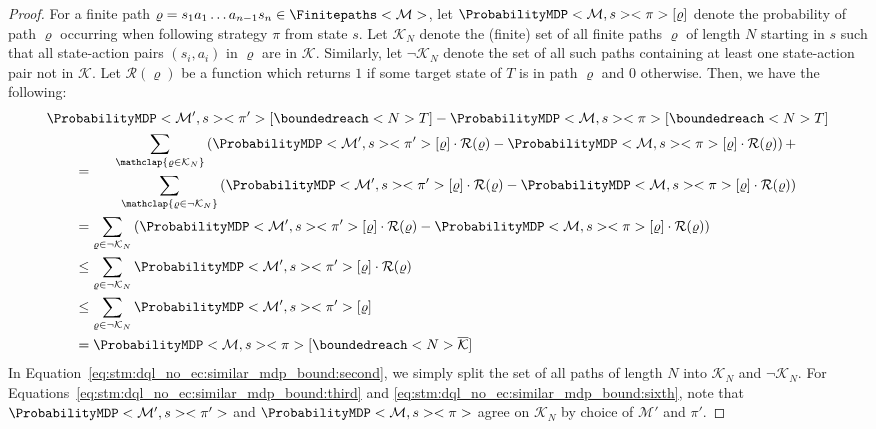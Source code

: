 \documentclass{theoretics}
\newcommand{\MDP}{\mathcal{M}}
\newcommand{\finitepath}{\varrho}
\newcommand{\strategy}{\pi}
\newcommand{\targetset}{T}
\begin{document}
\begin{proof}
	For a finite path $\finitepath = s_1 a_1 \ldots a_{n-1} s_n \in \Finitepaths<\MDP>$, let $\ProbabilityMDP<\MDP, s><\strategy>[\finitepath]$ denote the probability of path $\finitepath$ occurring when following strategy $\strategy$ from state $s$.
	Let $\mathcal{K}_N$ denote the (finite) set of all finite paths $\finitepath$ of length $N$ starting in $s$ such that all state-action pairs $(s_i, a_i)$ in $\finitepath$ are in $\mathcal{K}$.
	Similarly, let $\lnot \mathcal{K}_N$ denote the set of all such paths containing at least one state-action pair not in $\mathcal{K}$.
	Let $\mathcal{R}(\finitepath)$ be a function which returns $1$ if some target state of $\targetset$ is in path $\finitepath$ and $0$ otherwise.
	Then, we have the following:
	\begin{align}
		& \ProbabilityMDP<\MDP', s><\strategy'>[\boundedreach<N> \targetset] - \ProbabilityMDP<\MDP, s><\strategy>[\boundedreach<N> \targetset] \label{eq:stm:dql_no_ec:similar_mdp_bound:first} \\
		& \qquad = \begin{aligned}
				\sum_{\mathclap{\finitepath \in \mathcal{K}_N}} \left( \ProbabilityMDP<\MDP', s><\strategy'>[\finitepath] \cdot \mathcal{R}(\finitepath) - \ProbabilityMDP<\MDP, s><\strategy>[\finitepath] \cdot \mathcal{R}(\finitepath) \right) + & \\
				\qquad \sum_{\mathclap{\finitepath \in \lnot \mathcal{K}_N}} \left( \ProbabilityMDP<\MDP', s><\strategy'>[\finitepath] \cdot \mathcal{R}(\finitepath) - \ProbabilityMDP<\MDP, s><\strategy>[\finitepath] \cdot \mathcal{R}(\finitepath) \right) &
			\end{aligned} \label{eq:stm:dql_no_ec:similar_mdp_bound:second} \\
		& \qquad = \sum_{\finitepath \in \lnot \mathcal{K}_N} \left( \ProbabilityMDP<\MDP', s><\strategy'>[\finitepath] \cdot \mathcal{R}(\finitepath) - \ProbabilityMDP<\MDP, s><\strategy>[\finitepath] \cdot \mathcal{R}(\finitepath) \right) \label{eq:stm:dql_no_ec:similar_mdp_bound:third} \\
		& \qquad \leq \sum_{\finitepath \in \lnot \mathcal{K}_N} \ProbabilityMDP<\MDP', s><\strategy'>[\finitepath] \cdot \mathcal{R}(\finitepath) \label{eq:stm:dql_no_ec:similar_mdp_bound:fourth} \\
		& \qquad \leq \sum_{\finitepath \in \lnot \mathcal{K}_N} \ProbabilityMDP<\MDP', s><\strategy'>[\finitepath] \label{eq:stm:dql_no_ec:similar_mdp_bound:fifth} \\
		& \qquad = \ProbabilityMDP<\MDP, s><\strategy>[\boundedreach<N> \overline{\mathcal{K}}] \label{eq:stm:dql_no_ec:similar_mdp_bound:sixth}
	\end{align}
	In Equation~\eqref{eq:stm:dql_no_ec:similar_mdp_bound:second}, we simply split the set of all paths of length $N$ into $\mathcal{K}_N$ and $\lnot \mathcal{K}_N$.
	For Equations~\eqref{eq:stm:dql_no_ec:similar_mdp_bound:third} and \eqref{eq:stm:dql_no_ec:similar_mdp_bound:sixth}, note that $\ProbabilityMDP<\MDP', s><\strategy'>$ and $\ProbabilityMDP<\MDP, s><\strategy>$ agree on $\mathcal{K}_N$ by choice of $\MDP'$ and $\strategy'$. 
\end{proof}
\end{document}
